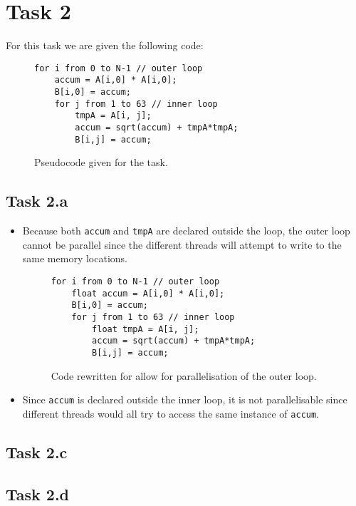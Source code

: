 \section{Task 2}

For this task we are given the following code:
\begin{figure}
    \begin{lstlisting}
for i from 0 to N-1 // outer loop
    accum = A[i,0] * A[i,0];
    B[i,0] = accum;
    for j from 1 to 63 // inner loop
        tmpA = A[i, j];
        accum = sqrt(accum) + tmpA*tmpA;
        B[i,j] = accum;
    \end{lstlisting}
    \caption{Pseudocode given for the task.}
    \label{fig:t2code1}
\end{figure}

\subsection{Task 2.a}

\begin{itemize}
    \item Because both \texttt{accum} and \texttt{tmpA} are declared outside the
    loop, the outer loop cannot be parallel since the different threads will
    attempt to write to the same memory locations.

    \begin{figure}
        \begin{lstlisting}
for i from 0 to N-1 // outer loop
    float accum = A[i,0] * A[i,0];
    B[i,0] = accum;
    for j from 1 to 63 // inner loop
        float tmpA = A[i, j];
        accum = sqrt(accum) + tmpA*tmpA;
        B[i,j] = accum;
        \end{lstlisting}
        \caption{Code rewritten for allow for parallelisation of the outer
            loop.}
        \label{fig:t2code2}
    \end{figure}

    \item Since \texttt{accum} is declared outside the inner loop, it is not
    parallelisable since different threads would all try to access the same
    instance of \texttt{accum}.


\end{itemize}


\subsection{Task 2.c}
\subsection{Task 2.d}
